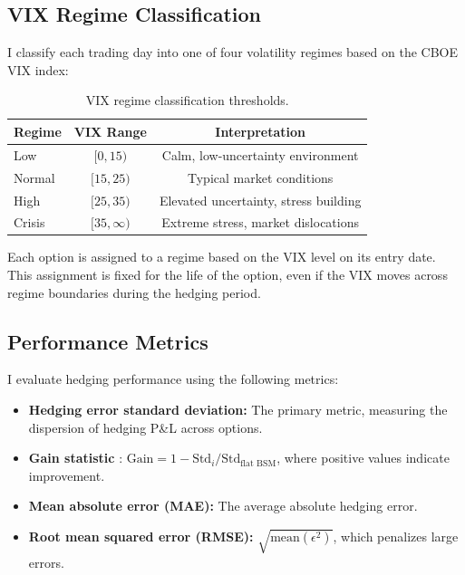 \documentclass[12pt, letterpaper]{article}
\begin{document}
\subsection{VIX Regime Classification}
\label{sec:regimes}

I classify each trading day into one of four volatility regimes based on the CBOE VIX index:

\begin{table}[H]
\centering
\caption{VIX regime classification thresholds.}
\label{tab:vix_thresholds}
\begin{tabular}{lcc}
\toprule
Regime & VIX Range & Interpretation \\
\midrule
Low     & $[0, 15)$    & Calm, low-uncertainty environment \\
Normal  & $[15, 25)$   & Typical market conditions \\
High    & $[25, 35)$   & Elevated uncertainty, stress building \\
Crisis  & $[35, \infty)$ & Extreme stress, market dislocations \\
\bottomrule
\end{tabular}
\end{table}

Each option is assigned to a regime based on the VIX level on its entry date. This assignment is fixed for the life of the option, even if the VIX moves across regime boundaries during the hedging period.

\subsection{Performance Metrics}
\label{sec:metrics}

I evaluate hedging performance using the following metrics:

\begin{itemize}
    \item \textbf{Hedging error standard deviation:} The primary metric, measuring the dispersion of hedging P\&L across options.
    \item \textbf{Gain statistic} \citep{Hull2017}: $\text{Gain} = 1 - \text{Std}_i / \text{Std}_{\text{flat BSM}}$, where positive values indicate improvement.
    \item \textbf{Mean absolute error (MAE):} The average absolute hedging error.
    \item \textbf{Root mean squared error (RMSE):} $\sqrt{\text{mean}(\epsilon^2)}$, which penalizes large errors.
\end{itemize}
\end{document}
